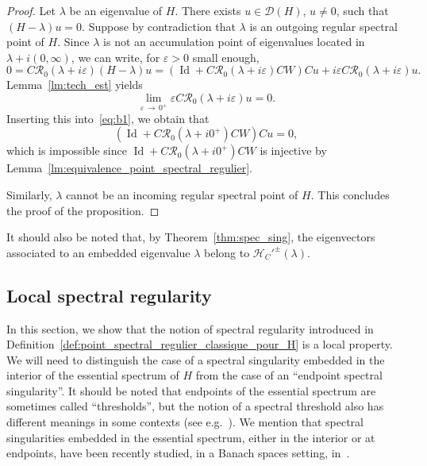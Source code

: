 \documentclass[10pt]{amsart}
\theoremstyle{definition}\newtheorem{defi}[theo]{Definition}\newtheorem{rema}[theo]{Remark}\newtheorem{exam}[theo]{Example}\newtheorem{exem}[theo]{Example}\newtheorem{nota}[theo]{Notation}
\newcommand{\Hi}{\mathcal{H}}
\newcommand{\Res}{\mathcal{R}}
\newcommand{\clD}{\mathcal{D}}
\DeclareMathOperator{\Id}{Id}
\begin{document}
\begin{proof}
Let $\lambda$ be an eigenvalue of $H$. There exists $u\in\clD(H)$, $u\neq 0$, such that $(H-\lambda)u=0$. Suppose by contradiction that $\lambda$ is an outgoing regular spectral point of $H$. Since $\lambda$ is not an accumulation point of eigenvalues located in $\lambda+i(0,\infty)$, we can write, for $\varepsilon>0$ small enough,
\begin{equation}\label{eq:b1}
0=C\Res_0(\lambda+i\varepsilon)(H-\lambda)u=(\Id+C\Res_0(\lambda+i\varepsilon)CW)Cu+i\varepsilon C\Res_0(\lambda+i\varepsilon)u.
\end{equation}
Lemma~\ref{lm:tech_est} yields
\begin{equation*}
\lim_{\varepsilon\,\rightarrow\,0^+}\varepsilon C\Res_0(\lambda+i\varepsilon)u=0.
\end{equation*}
Inserting this into~\eqref{eq:b1}, we obtain that
\begin{equation*}
(\Id+C\Res_0(\lambda+i0^+)CW)Cu=0,
\end{equation*}
which is impossible since $\Id+C\Res_0(\lambda+i0^+)CW$ is injective by Lemma~\ref{lm:equivalence_point_spectral_regulier}.

Similarly, $\lambda$ cannot be an incoming regular spectral point of $H$. This concludes the proof of the proposition.
\end{proof}


It should also be noted that, by Theorem~\ref{thm:spec_sing}, the eigenvectors associated to an embedded eigenvalue $\lambda$ belong to $\Hi_C'^\pm(\lambda)$.



\subsection{Local spectral regularity}\label{subsec:local}

In this section, we show that the notion of spectral regularity introduced in Definition~\ref{def:point_spectral_regulier_classique_pour_H} is a local property. We will need to distinguish the case of a spectral singularity embedded in the interior of the essential spectrum of $H$ from the case of an ``endpoint spectral singularity''. It should be noted that endpoints of the essential spectrum are sometimes called ``thresholds'', but the notion of a spectral threshold also has different meanings in some contexts (see e.g.~\cite{Ho74_01}). We mention that spectral singularities embedded in the essential spectrum, either in the interior or at endpoints, have been recently studied, in a Banach spaces setting, in~\cite{BoCo22_01}.
\end{document}
